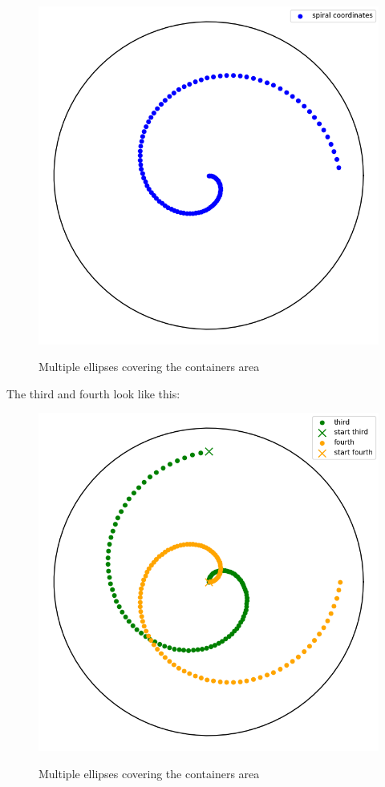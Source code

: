 \begin{figure}[H]
    \includegraphics[scale=0.35]{Graphics/motions/whirlstorm2.png}
    \centering
    \label{fig:foldingMotion1}
    \caption{Multiple ellipses covering the containers area}
\end{figure}
The third and fourth look like this:

\begin{figure}[H]
    \includegraphics[scale=0.35]{Graphics/motions/whirlstorm3.png}
    \centering
    \label{fig:foldingMotion1}
    \caption{Multiple ellipses covering the containers area}
\end{figure}